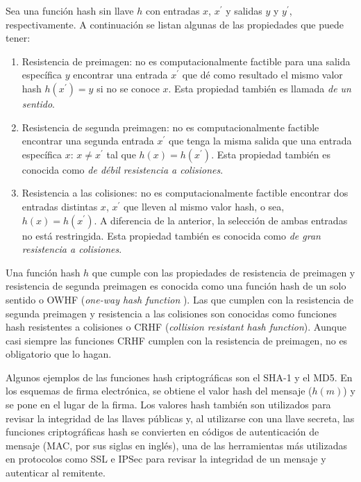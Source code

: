 Sea una función hash sin llave $h$ con entradas $x$, $x^\prime$ y
salidas $y$ y $y^\prime$, respectivamente. A continuación se listan
algunas de las propiedades que puede tener:
\begin{enumerate}
  \item Resistencia de preimagen: no es computacionalmente factible
    para una salida específica $y$ encontrar una entrada $x^\prime$ que
    dé como resultado el mismo valor hash $h(x^\prime) = y$ si no se
    conoce $x$. Esta propiedad también es llamada
    \textit{de un sentido}.
  \item Resistencia de segunda preimagen: no es computacionalmente
    factible encontrar una segunda entrada $x^\prime$  que tenga la
    misma salida que una entrada específica $x$: $x \neq x^\prime$
    tal que $h(x) = h(x^\prime)$. Esta propiedad también es conocida
    como \textit{de débil resistencia a colisiones}.
  \item Resistencia a las colisiones: no es computacionalmente factible
    encontrar dos entradas distintas $x$, $x^\prime$ que lleven al
    mismo valor hash, o sea, $h(x) = h(x^\prime)$. A diferencia de la
    anterior, la selección de ambas entradas no está restringida. Esta
    propiedad también es conocida como
    \textit{de gran resistencia a colisiones}.
\end{enumerate}

Una función hash $h$ que cumple con las propiedades de resistencia de
preimagen y resistencia de segunda preimagen es conocida como una
función hash de un solo sentido o OWHF (\textit{one-way hash function}
). Las que cumplen con la resistencia de segunda preimagen y
resistencia a las colisiones son conocidas como funciones hash
resistentes a colisiones o CRHF
(\textit{collision resistant hash function}). Aunque casi siempre las
funciones CRHF cumplen con la resistencia de preimagen, no es
obligatorio que lo hagan.

Algunos ejemplos de las funciones hash criptográficas son el SHA-1 y el
MD5. En los esquemas de firma electrónica, se obtiene el valor hash del
mensaje ($h(m)$) y se pone en el lugar de la firma. Los valores hash
también son utilizados para revisar la integridad de las llaves
públicas y, al utilizarse con una llave secreta, las funciones
criptográficas hash se convierten en códigos de autenticación de
mensaje (MAC, por sus siglas en inglés), una de las herramientas más
utilizadas en protocolos como SSL e IPSec para revisar la integridad de
un mensaje y autenticar al remitente.


